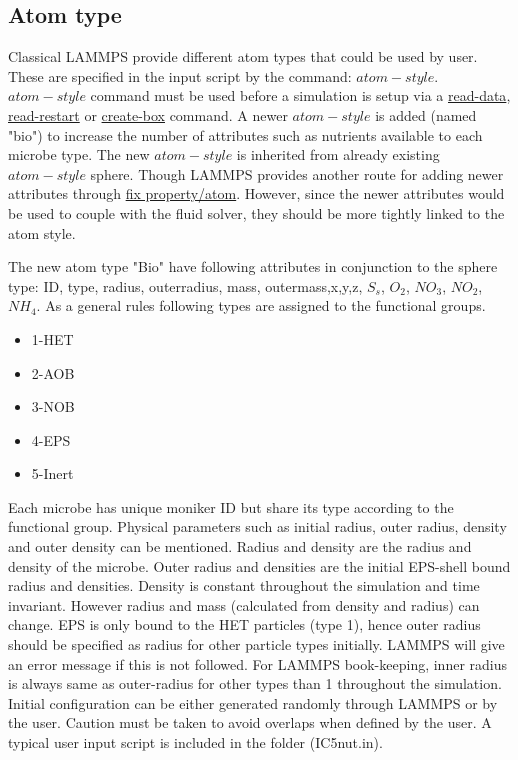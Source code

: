 \documentclass[11pt,a4paper,openright]{article}
\begin{document}
\subsection{Atom type}
Classical LAMMPS provide different atom types that could be used by user. These are specified in the input script by the command: \href{http://lammps.sandia.gov/doc/atom_style.html}{$atom-style$}. \href{http://lammps.sandia.gov/doc/atom_style.html}{$atom-style$} command must be used before a simulation is setup via a \href{http://lammps.sandia.gov/doc/read_data.html}{read-data}, \href{http://lammps.sandia.gov/doc/read_restart.html}{read-restart} or \href{http://lammps.sandia.gov/doc/create_box.html}{create-box} command. A newer $atom-style$ is added (named "bio") to increase the number of attributes such as nutrients available to each microbe type. The new $atom-style$ is inherited from already existing $atom-style$ sphere. Though LAMMPS provides another route for adding newer attributes through \href{http://lammps.sandia.gov/doc/fix_property_atom.html}{fix property/atom}. However, since the newer attributes would be used to couple with the fluid solver, they should be more tightly linked to the atom style. 

The new atom type "Bio" have following attributes in conjunction to the sphere type: ID, type, radius, outerradius, mass, outermass,x,y,z, $S_s$, $O_2$, $NO_3$, $NO_2$, $NH_4$. As a general rules following types are assigned to the functional groups. 

\begin{itemize}
\item 1-HET 
\item 2-AOB
\item 3-NOB
\item 4-EPS
\item 5-Inert
\end{itemize} 

Each microbe has unique moniker ID but share its type according to the functional group. Physical parameters such as initial radius, outer radius, density and outer density can be mentioned. Radius and density are the radius and density of the microbe. Outer radius and densities are the initial EPS-shell bound radius and densities. Density is constant throughout the simulation and time invariant. However radius and mass (calculated from density and radius) can change. EPS is only bound to the HET particles (type 1), hence outer radius should be specified as radius for other particle types initially. LAMMPS will give an error message if this is not followed. For LAMMPS book-keeping, inner radius is always same as outer-radius for other types than 1 throughout the simulation. Initial configuration can be either generated randomly through LAMMPS or by the user. Caution must be taken to avoid overlaps when defined by the user. A typical user input script is included in the folder (IC5nut.in). 
\end{document}
